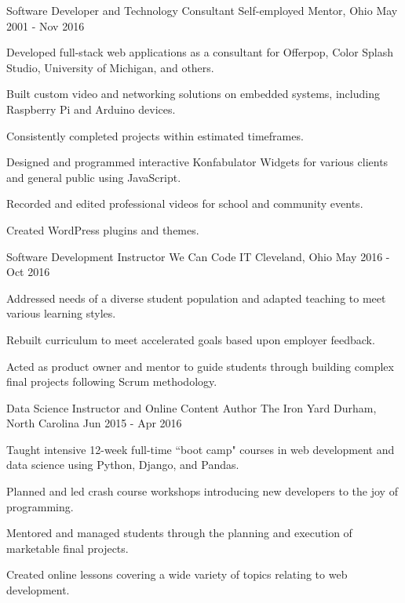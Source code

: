 \begin{cventries}
\cventry
{Software Developer and Technology Consultant} %
{Self-employed} %
{Mentor, Ohio} %
{May 2001 - Nov 2016} %
{ %
\begin{cvitems}
\item {Developed full-stack web applications as a consultant for Offerpop, Color Splash Studio, University of Michigan, and others.}
\item {Built custom video and networking solutions on embedded systems, including Raspberry Pi and Arduino devices.}
\item {Consistently completed projects within estimated timeframes.}
\item {Designed and programmed interactive Konfabulator Widgets for various clients and general public using JavaScript.}
\item {Recorded and edited professional videos for school and community events.}
\item {Created WordPress plugins and themes.}
\end{cvitems}
}


\cventry
{Software Development Instructor} %
{We Can Code IT} %
{Cleveland, Ohio} %
{May 2016 - Oct 2016} %
{ %
\begin{cvitems}
\item {Addressed needs of a diverse student population and adapted teaching to meet various learning styles.}
\item {Rebuilt curriculum to meet accelerated goals based upon employer feedback.}
\item {Acted as product owner and mentor to guide students through building complex final projects following Scrum methodology.}
\end{cvitems}
}


\cventry
{Data Science Instructor and Online Content Author} %
{The Iron Yard} %
{Durham, North Carolina} %
{Jun 2015 - Apr 2016} %
{ %
\begin{cvitems}
\item {Taught intensive 12-week full-time ``boot camp" courses in web development and data science using Python, Django, and Pandas.}
\item {Planned and led crash course workshops introducing new developers to the joy of programming.}
\item {Mentored and managed students through the planning and execution of marketable final projects.}
\item {Created online lessons covering a wide variety of topics relating to web development.}
\end{cvitems}
}


\end{cventries}
